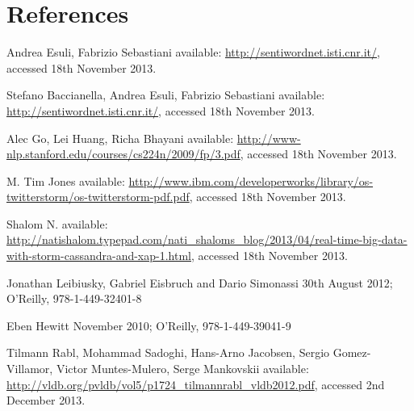 \documentclass[a4paper]{article}
\begin{document}
\section{References}




\begin{thebibliography}{20}

	Andrea Esuli, Fabrizio Sebastiani
	\newblock available: \url{http://sentiwordnet.isti.cnr.it/}, accessed 18th November 2013.
	
	Stefano Baccianella, Andrea Esuli, Fabrizio Sebastiani
	\newblock available: \url{http://sentiwordnet.isti.cnr.it/}, accessed 18th November 2013.
	
	Alec Go, Lei Huang, Richa Bhayani
	\newblock available: \url{http://www-nlp.stanford.edu/courses/cs224n/2009/fp/3.pdf}, accessed 18th November 2013.
	
	M. Tim Jones
	\newblock available: \url{http://www.ibm.com/developerworks/library/os-twitterstorm/os-twitterstorm-pdf.pdf}, accessed 18th November 2013.
	
	Shalom N. 
	\newblock available: \url{http://natishalom.typepad.com/nati_shaloms_blog/2013/04/real-time-big-data-with-storm-cassandra-and-xap-1.html}, accessed 18th November 2013.

	Jonathan Leibiusky, Gabriel Eisbruch and Dario Simonassi 
	\newblock 30th August 2012; O'Reilly, 978-1-449-32401-8

	Eben Hewitt 
	\newblock November 2010; O'Reilly, 978-1-449-39041-9

	Tilmann Rabl, Mohammad Sadoghi, Hans-Arno Jacobsen, Sergio Gomez-Villamor, Victor Muntes-Mulero, Serge Mankovskii
	\newblock available: \url{http://vldb.org/pvldb/vol5/p1724_tilmannrabl_vldb2012.pdf}, accessed 2nd December 2013.


\end{thebibliography}
\end{document}
